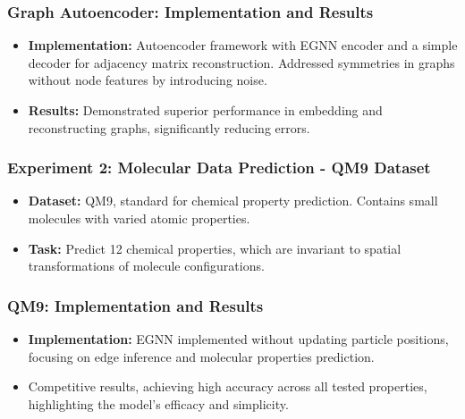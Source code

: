 \documentclass[11pt,xcolor={dvipsnames},hyperref={pdftex,pdfpagemode=UseNone,hidelinks,pdfdisplaydoctitle=true},usepdftitle=false]{beamer}
\begin{document}
\begin{frame}
\frametitle{Graph Autoencoder: Implementation and Results}
\begin{itemize}
    \item \textbf{Implementation:} Autoencoder framework with EGNN encoder and a simple decoder for adjacency matrix reconstruction. Addressed symmetries in graphs without node features by introducing noise.
    \item \textbf{Results:} Demonstrated superior performance in embedding and reconstructing graphs, significantly reducing errors.
\end{itemize}
\end{frame}


\begin{frame}
\frametitle{Experiment 2: Molecular Data Prediction - QM9 Dataset}
\begin{itemize}
    \item \textbf{Dataset:} QM9, standard for chemical property prediction. Contains small molecules with varied atomic properties.
    \item \textbf{Task:} Predict 12 chemical properties, which are invariant to spatial transformations of molecule configurations.
\end{itemize}
\end{frame}


\begin{frame}
\frametitle{QM9: Implementation and Results}
\begin{itemize}
    \item \textbf{Implementation:} EGNN implemented without updating particle positions, focusing on edge inference and molecular properties prediction.
    \item Competitive results, achieving high accuracy across all tested properties, highlighting the model's efficacy and simplicity.
\end{itemize}
\end{frame}
                                    
\end{document}
